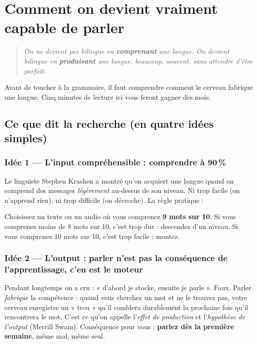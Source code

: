 \chapter{Comment on devient vraiment capable de parler}

\begin{quote}
\itshape
On ne devient pas bilingue en \textbf{comprenant} une langue. On devient bilingue en
\textbf{produisant} une langue, beaucoup, souvent, sans attendre d'être parfait.
\end{quote}

Avant de toucher à la grammaire, il faut comprendre comment le cerveau fabrique une langue.
Cinq minutes de lecture ici vous feront gagner des mois.

\section{Ce que dit la recherche (en quatre idées simples)}

\subsection{Idée 1 --- L'input compréhensible : comprendre à 90\,\%}
Le linguiste Stephen Krashen a montré qu'on acquiert une langue quand on comprend des
messages \emph{légèrement} au-dessus de son niveau. Ni trop facile (on n'apprend rien),
ni trop difficile (on décroche). La règle pratique :

\begin{memo}
Choisissez un texte ou un audio où vous comprenez \textbf{9 mots sur 10}. Si vous comprenez
moins de 8 mots sur 10, c'est trop dur : descendez d'un niveau. Si vous comprenez
10 mots sur 10, c'est trop facile : montez.
\end{memo}

\subsection{Idée 2 --- L'output : parler n'est pas la conséquence de l'apprentissage, c'en est le moteur}
Pendant longtemps on a cru : « d'abord je stocke, ensuite je parle ». Faux. Parler
\emph{fabrique} la compétence : quand vous cherchez un mot et ne le trouvez pas, votre
cerveau enregistre un « trou » qu'il comblera durablement la prochaine fois qu'il rencontrera
le mot. C'est ce qu'on appelle l'\emph{effet de production} et l'\emph{hypothèse de
l'output} (Merrill Swain). Conséquence pour vous : \textbf{parlez dès la première semaine},
même mal, même seul.

